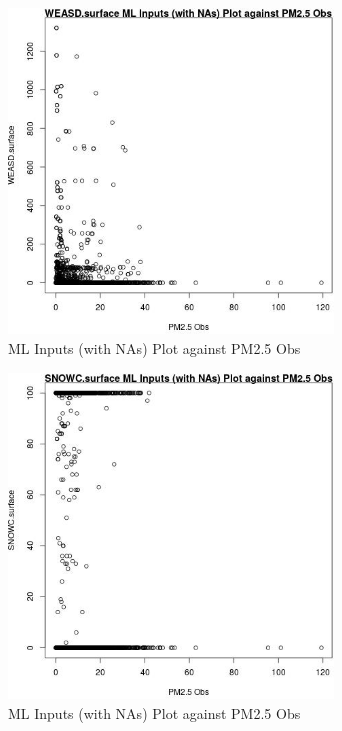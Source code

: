 \begin{figure} 
\centering  
\includegraphics[width=0.77\textwidth]{Code_Outputs/Report_ML_input_PM25_Step4_part_e_de_duplicated_aves_compiled_2019-05-18wNAs_WEASDsurfacevPM25_Obs.jpg} 
\caption{\label{fig:Report_ML_input_PM25_Step4_part_e_de_duplicated_aves_compiled_2019-05-18wNAsWEASDsurfacevPM25_Obs}ML Inputs (with NAs) Plot against PM2.5 Obs} 
\end{figure} 
 

\clearpage 

\begin{figure} 
\centering  
\includegraphics[width=0.77\textwidth]{Code_Outputs/Report_ML_input_PM25_Step4_part_e_de_duplicated_aves_compiled_2019-05-18wNAs_SNOWCsurfacevPM25_Obs.jpg} 
\caption{\label{fig:Report_ML_input_PM25_Step4_part_e_de_duplicated_aves_compiled_2019-05-18wNAsSNOWCsurfacevPM25_Obs}ML Inputs (with NAs) Plot against PM2.5 Obs} 
\end{figure} 
 

